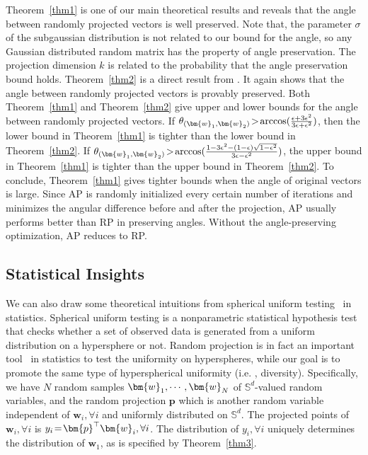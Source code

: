 \par
Theorem~\ref{thm1} is one of our main theoretical results and reveals that the angle between randomly projected vectors is well preserved. Note that, the parameter $\sigma$ of the subgaussian distribution is not related to our bound for the angle, so any Gaussian distributed random matrix has the property of angle preservation. The projection dimension $k$ is related to the probability that the angle preservation bound holds. Theorem~\ref{thm2} is a direct result from \cite{shi2012margin}. It again shows that the angle between randomly projected vectors is provably preserved. Both Theorem~\ref{thm1} and Theorem~\ref{thm2} give upper and lower bounds for the angle between randomly projected vectors. If $\thickmuskip=2mu \medmuskip=2mu \theta_{(\bm{w}_1,\bm{w}_2)}>\arccos(\frac{\epsilon+3\epsilon^2}{3\epsilon+\epsilon^2})$, then the lower bound in Theorem~\ref{thm1} is tighter than the lower bound in Theorem~\ref{thm2}. If $\thickmuskip=2mu \medmuskip=2mu \theta_{(\bm{w}_1,\bm{w}_2)}>\arccos(\frac{1-3\epsilon^2-(1-\epsilon)\sqrt{1-\epsilon^2}}{3\epsilon-\epsilon^2})$, the upper bound in Theorem~\ref{thm1} is tighter than the upper bound in Theorem~\ref{thm2}. To conclude, Theorem~\ref{thm1} gives tighter bounds when the angle of original vectors is large. Since AP is randomly initialized every certain number of iterations and minimizes the angular difference before and after the projection, AP usually performs better than RP in preserving angles. Without the angle-preserving optimization, AP reduces to RP.

\subsection{Statistical Insights}

We can also draw some theoretical intuitions from spherical uniform testing~\cite{cuesta2009projection} in statistics. Spherical uniform testing is a nonparametric statistical hypothesis test that checks whether a set of observed data is generated from a uniform distribution on a hypersphere or not. Random projection is in fact an important tool~\cite{cuesta2009projection} in statistics to test the uniformity on hyperspheres, while our goal is to promote the same type of hyperspherical uniformity (i.e. , diversity). Specifically, we have $N$ random samples $\thickmuskip=2mu \medmuskip=2mu \bm{w}_1,\cdots,\bm{w}_N$ of $\mathbb{S}^d$-valued random variables, and the random projection $\bm{p}$ which is another random variable independent of $\bm{w}_i,\forall i$ and uniformly distributed on $\mathbb{S}^d$. The projected points of $\bm{w}_i,\forall i$ is $\thickmuskip=2mu \medmuskip=2mu y_i=\bm{p}^\top \bm{w}_i,\forall i$. The distribution of $y_i,\forall i$ uniquely determines the distribution of $\bm{w}_1$, as is specified by Theorem~\ref{thm3}.
\par

